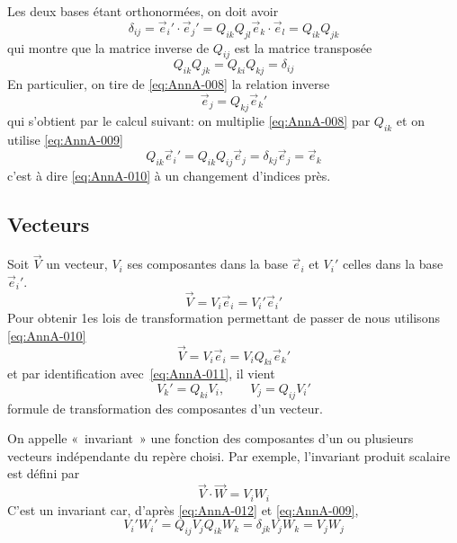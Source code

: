 Les deux bases étant orthonormées, on doit avoir
\begin{equation*}
    \delta_{ij} = \vec{e}_i{}' \cdot \vec{e}_j{}' = Q_{ik} Q_{jl} \vec{e}_k \cdot \vec{e}_l = Q_{ik} Q_{jk}
\end{equation*}
qui montre que la matrice inverse de $Q_{ij}$ est la matrice transposée
\begin{equation}
    Q_{ik}Q_{jk} = Q_{ki} Q_{kj} = \delta_{ij}
    \label{eq:AnnA-009}
\end{equation}
En particulier, on tire de \eqref{eq:AnnA-008} la relation inverse
\begin{equation}
    \vec{e}_j = Q_{kj} \vec{e}_k{}'
    \label{eq:AnnA-010}
\end{equation}
qui s'obtient par le calcul suivant: on multiplie \eqref{eq:AnnA-008} par $Q_{ik}$ et on utilise \eqref{eq:AnnA-009}
\begin{equation*}
    Q_{ik} \vec{e}_i{}' = Q_{ik} Q_{ij} \vec{e}_j = \delta_{kj} \vec{e}_j = \vec{e}_k
\end{equation*}
c'est à dire \eqref{eq:AnnA-010} à un changement d'indices près.
\subsection{Vecteurs}
Soit $\vec{V}$ un vecteur, $V_i$ ses composantes dans la base $\vec{e}_i$ et $V_i'$ celles dans la base $\vec{e}_i{}'$.
\begin{equation}
    \vec{V} = V_i \vec{e}_i = V_i' \vec{e}_i{}'
    \label{eq:AnnA-011}
\end{equation}
Pour obtenir 1es lois de transformation permettant de passer de nous utilisons \eqref{eq:AnnA-010}
\begin{displaymath}
    \vec{V} = V_i \vec{e}_i = V_i Q_{ki} \vec{e}_k{}'
\end{displaymath}
et par identification avec~\eqref{eq:AnnA-011}, il vient
\begin{equation}
    V_k' = Q_{ki} V_i, \qquad V_j =  Q_{ij} V_i'
    \label{eq:AnnA-012}
\end{equation}
formule de transformation des composantes d'un vecteur.

On appelle «~invariant~» une fonction des composantes d'un ou plusieurs vecteurs indépendante du repère choisi.
Par exemple, l'invariant produit scalaire est défini par
\begin{equation}
    \vec{V}\cdot \vec{W} = V_i W_i
    \label{eq:AnnA-013}
\end{equation}
C'est un invariant car, d'après \eqref{eq:AnnA-012} et \eqref{eq:AnnA-009},
\begin{displaymath}
    V_i' W_i' = Q_{ij} V_j Q_{ik} W_k = \delta_{jk} V_j W_k = V_j W_j
\end{displaymath}
